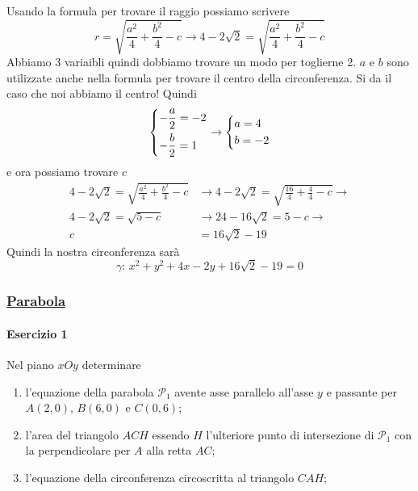 Usando la formula per trovare il raggio possiamo scrivere
\begin{equation*}
  r = \sqrt{\frac{a^2}{4}+\frac{b^2}{4}-c} \rightarrow 
  4-2\sqrt{2} = \sqrt{\frac{a^2}{4}+\frac{b^2}{4}-c}
\end{equation*}
Abbiamo 3 variaibli quindi dobbiamo trovare un modo per toglierne 2. $a$ e $b$ sono utilizzate anche 
nella formula per trovare il centro della circonferenza. Si da il caso che noi abbiamo il centro!
Quindi
\begin{equation*}
  \begin{dcases}
    -\frac{a}{2} = -2\\
    -\frac{b}{2} = 1
  \end{dcases}\rightarrow
  \begin{dcases}
    a=4\\
    b=-2
  \end{dcases}
\end{equation*}
e ora possiamo trovare $c$
\begin{align*}
  4-2\sqrt{2} = \sqrt{\frac{a^2}{4}+\frac{b^2}{4}-c} &\rightarrow 
  4-2\sqrt{2} = \sqrt{\frac{16}{4}+\frac{4}{4}-c} \rightarrow\\
  4-2\sqrt{2} = \sqrt{5-c} &\rightarrow
  24-16\sqrt{2} = 5-c \rightarrow\\
  c &= 16\sqrt{2}-19
\end{align*}
Quindi la nostra circonferenza sarà
\begin{equation*}
  \boxed{\gamma:\, x^2+y^2+4x-2y+16\sqrt{2}-19=0}
\end{equation*}

\subsubsection*{\hyperref[subsec:geomanal:parabola]{Parabola}}\label{ex:parabola}
\paragraph{Esercizio 1}
Nel piano $xOy$ determinare
\begin{enumerate}
  \item l'equazione della parabola $\mathscr{P}_1$ avente asse parallelo all'asse $y$ e passante per
    $A(2,0)$, $B(6,0)$ e $C(0,6)$;\label{enum:ex:parabola:1:1}
  \item l'area del triangolo $ACH$ essendo $H$ l'ulteriore punto di intersezione di $\mathscr{P}_1$
    con la perpendicolare per $A$ alla retta $AC$;\label{enum:ex:parabola:1:2}
  \item l'equazione della circonferenza circoscritta al triangolo $CAH$;\label{enum:ex:parabola:1:3}
\end{enumerate}
\divisor

